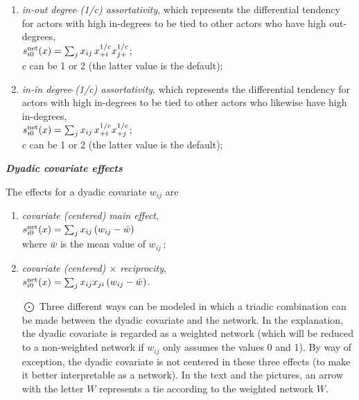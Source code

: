 \documentclass[a4paper,fleqn]{article}
\newcommand{\+}{\, + \,}
\newcommand{\vit}{\theenumi}
\newcounter{savenumi}
\begin{document}
{\begin{enumerate}
 \item {\em in-out degree$\,\hat{\ }$(1/c) assortativity},
 which represents the differential tendency for actors with high in-degrees
 to be tied to other actors who have high out-degrees,\\
 $s^{\rm net}_{i\vit}(x) = \sum_j x_{ij}\, {x_{+i}^{1/c}} {x_{j+}^{1/c}} $;\\
 $c$ can be 1 or 2 (the latter value is the default);

 \item {\em in-in degree$\,\hat{\ }$(1/c) assortativity},
 which represents the differential tendency for actors with high in-degrees
 to be tied to other actors who likewise have high in-degrees,\\
 $s^{\rm net}_{i\vit}(x) = \sum_j x_{ij}\, {x_{+i}^{1/c}} {x_{+j}^{1/c}} $;\\
 $c$ can be 1 or 2 (the latter value is the default);

\setcounter{savenumi}{\value{enumi}}
\end{enumerate}
\medskip

\noindent
\textbf{\emph{Dyadic covariate effects}}
\medskip

\noindent
The effects for a dyadic covariate $w_{ij}$ are
\begin{enumerate}
\setcounter{enumi}{\value{savenumi}}

 \item {\em covariate (centered) main effect},\\
 $s^{\rm net}_{i\vit}(x) = \sum_j x_{ij} \, (w_{ij} - \bar{w}) $\\
 where $\bar{w}$ is the mean value of $w_{ij}\,$;

 \item {\em covariate (centered) $\times$ reciprocity},\\
 $s^{\rm net}_{i\vit}(x) = \sum_j x_{ij} x_{ji} \, (w_{ij} - \bar{w}) $.

 \item[{\hspace*{-1ex}$\bigodot$}]
 Three different ways can be modeled in which
 a triadic combination can be made between
 the dyadic covariate and the network.
 In the explanation, the dyadic covariate
 is regarded as a weighted network
 (which will be reduced to a non-weighted network if $w_{ij}$ only
 assumes the values 0 and 1).
 By way of exception, the dyadic covariate
 is not centered in these three effects
 (to make it better interpretable as a network).
 In the text and the pictures, an arrow with the letter $W$
 represents a tie according to the weighted network $W$.


\end{enumerate}}
\end{document}
